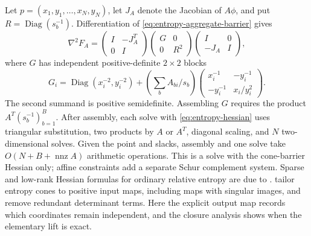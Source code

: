 Let $p=(x_1,y_1,\ldots,x_N,y_N)$, let $J_A$ denote the Jacobian of
$A\phi$, and put $R=\operatorname{Diag}(s_b^{-1})$.  Differentiation of
\eqref{eq:entropy-aggregate-barrier} gives
\begin{equation}\label{eq:entropy-hessian}
 \nabla^2F_A=
 \begin{pmatrix}I&-J_A^T\\0&I\end{pmatrix}
 \begin{pmatrix}G&0\\0&R^2\end{pmatrix}
 \begin{pmatrix}I&0\\-J_A&I\end{pmatrix},
\end{equation}
where $G$ has independent positive-definite $2\times2$ blocks
\[
 G_i=\operatorname{Diag}(x_i^{-2},y_i^{-2})+
 \left(\sum_b A_{bi}/s_b\right)
 \begin{pmatrix}x_i^{-1}&-y_i^{-1}\\-y_i^{-1}&x_i/y_i^2\end{pmatrix}.
\]
The second summand is positive semidefinite.  Assembling $G$ requires the
product $A^T(s_b^{-1})_{b=1}^B$.  After assembly, each solve with
\eqref{eq:entropy-hessian} uses triangular substitution, two products by
$A$ or $A^T$, diagonal scaling, and $N$ two-dimensional solves.  Given
the point and slacks, assembly and one solve take
$O(N+B+\operatorname{nnz}A)$ arithmetic operations.  This is a solve
with the cone-barrier Hessian only; affine constraints add a separate
Schur complement system.
Sparse and low-rank Hessian formulas for ordinary relative entropy are
due to \citet{ChenGoulart2025}.  \citet{HeSaundersonFawzi2026} tailor
entropy cones to positive input maps, including maps with singular
images, and remove redundant determinant terms.  Here the explicit
output map records which coordinates remain independent, and the closure
analysis shows when the elementary lift is exact.
